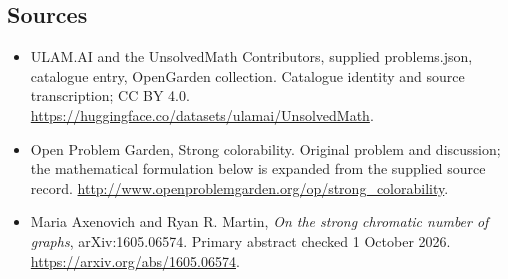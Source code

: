 \documentclass[11pt,a4paper]{article}
\begin{document}
\subsection{Sources}
\begin{itemize}
\item[S1] ULAM.AI and the UnsolvedMath Contributors, supplied problems.json, catalogue entry, OpenGarden collection. Catalogue identity and source transcription; CC BY 4.0.
\url{https://huggingface.co/datasets/ulamai/UnsolvedMath}.
\item[S2] Open Problem Garden, Strong colorability. Original problem and discussion; the mathematical formulation below is expanded from the supplied source record.
\url{http://www.openproblemgarden.org/op/strong_colorability}.
\item[R1] Maria Axenovich and Ryan R. Martin, \emph{On the strong
chromatic number of graphs}, arXiv:1605.06574. Primary abstract checked
1 October 2026. \url{https://arxiv.org/abs/1605.06574}.
\end{itemize}
\end{document}
